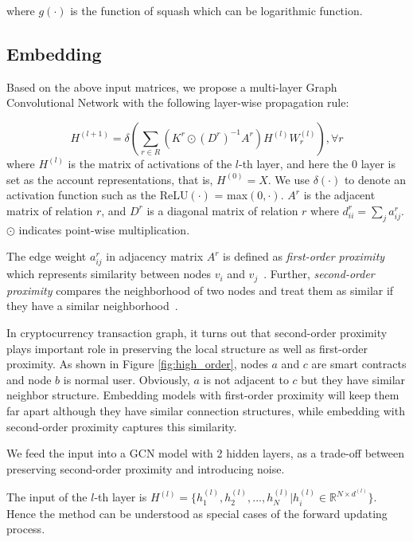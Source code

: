 \noindent where $g(\cdot)$ is the function of squash which can be logarithmic function.

\subsection{Embedding}
\label{sec:rGCN layers}
Based on the above input matrices, we propose a multi-layer Graph Convolutional Network with the following layer-wise propagation rule:

\begin{equation}
H^{(l+1)}=\delta(\sum_{r\in R} (K^r\odot (D^r)^{-1}A^r)H^{(l)}W_r^{(l)}),\forall r
\end{equation}
\noindent where $H^{(l)}$ is the matrix of activations of the $l$-th layer, and here the $0$ layer is set as the account representations, that is, $H^{(0)}=X$. We use $\delta(\cdot)$ to denote an activation function such as the ReLU$(\cdot)$ = max$(0,\cdot)$. $A^r$ is the adjacent matrix of relation $r$, and $D^r$ is a diagonal matrix of relation $r$ where $d^r_{ii}=\sum_{j}a^r_{ij}$. $\odot$ indicates point-wise multiplication.

The edge weight $a^r_{ij}$ in adjacency matrix $A^r$ is defined as \emph{first-order proximity} which represents similarity between nodes $v_i$ and $v_j$~\cite{tang2015line}. Further, \emph{second-order proximity} compares the neighborhood of two nodes and treat them as similar if they have a similar neighborhood~\cite{goyal2018graph}.

In cryptocurrency transaction graph, it turns out that second-order proximity plays important role in preserving the local structure as well as first-order proximity. As shown in Figure \ref{fig:high_order}, nodes $a$ and $c$ are smart contracts and node $b$ is normal user. Obviously, $a$ is not adjacent to $c$  but they have similar neighbor structure. Embedding models with first-order proximity will keep them far apart although they have similar connection structures, while embedding with second-order proximity captures this similarity.

 We feed the input into a GCN model with 2 hidden layers, as a trade-off between preserving second-order proximity and introducing noise. 
 
 The input of the $l$-th layer is $H^{(l)}=\{h_1^{(l)},h_2^{(l)},...,h_N^{(l)}|h_i^{(l)}\in \mathbb{R}^{N \times d^{(l)}}\}$. Hence the method can be understood as special cases of the forward updating process.

